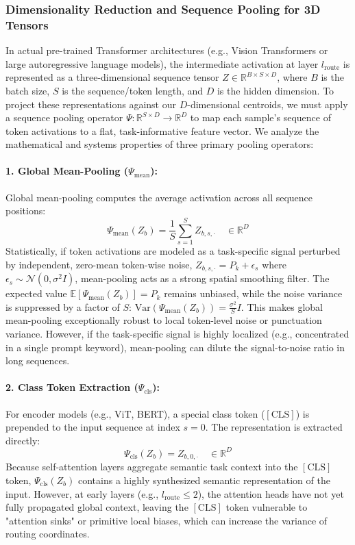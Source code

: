 \subsubsection{Dimensionality Reduction and Sequence Pooling for 3D Tensors}
\label{subsec:pooling_comparison}
In actual pre-trained Transformer architectures (e.g., Vision Transformers or large autoregressive language models), the intermediate activation at layer $l_{\text{route}}$ is represented as a three-dimensional sequence tensor $Z \in \mathbb{R}^{B \times S \times D}$, where $B$ is the batch size, $S$ is the sequence/token length, and $D$ is the hidden dimension. To project these representations against our $D$-dimensional centroids, we must apply a sequence pooling operator $\Psi: \mathbb{R}^{S \times D} \to \mathbb{R}^D$ to map each sample's sequence of token activations to a flat, task-informative feature vector. We analyze the mathematical and systems properties of three primary pooling operators:

\paragraph{1. Global Mean-Pooling ($\Psi_{\text{mean}}$):}
Global mean-pooling computes the average activation across all sequence positions:
\begin{equation}
    \Psi_{\text{mean}}(Z_b) = \frac{1}{S} \sum_{s=1}^S Z_{b, s, \cdot} \quad \in \mathbb{R}^D
\end{equation}
Statistically, if token activations are modeled as a task-specific signal perturbed by independent, zero-mean token-wise noise, $Z_{b, s, \cdot} = P_{k} + \epsilon_s$ where $\epsilon_s \sim \mathcal{N}(0, \sigma^2 I)$, mean-pooling acts as a strong spatial smoothing filter. The expected value $\mathbb{E}[\Psi_{\text{mean}}(Z_b)] = P_k$ remains unbiased, while the noise variance is suppressed by a factor of $S$: $\text{Var}(\Psi_{\text{mean}}(Z_b)) = \frac{\sigma^2}{S} I$.
This makes global mean-pooling exceptionally robust to local token-level noise or punctuation variance. However, if the task-specific signal is highly localized (e.g., concentrated in a single prompt keyword), mean-pooling can dilute the signal-to-noise ratio in long sequences.

\paragraph{2. Class Token Extraction ($\Psi_{\text{cls}}$):}
For encoder models (e.g., ViT, BERT), a special class token ($[\text{CLS}]$) is prepended to the input sequence at index $s = 0$. The representation is extracted directly:
\begin{equation}
    \Psi_{\text{cls}}(Z_b) = Z_{b, 0, \cdot} \quad \in \mathbb{R}^D
\end{equation}
Because self-attention layers aggregate semantic task context into the $[\text{CLS}]$ token, $\Psi_{\text{cls}}(Z_b)$ contains a highly synthesized semantic representation of the input. However, at early layers (e.g., $l_{\text{route}} \le 2$), the attention heads have not yet fully propagated global context, leaving the $[\text{CLS}]$ token vulnerable to "attention sinks" or primitive local biases, which can increase the variance of routing coordinates.

